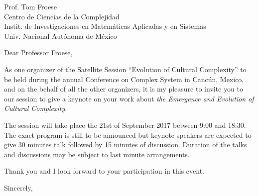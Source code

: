 \documentclass[11pt, a4paper]{letter} %
\begin{document}

\begin{letter}{
	 
	Prof.  Tom Froese\\
	Centro de Ciencias de la Complejidad\\
	Instit. de Investigaciones en Matemáticas Aplicadas y en Sistemas\\
	Univ. Nacional Autónoma de M\'exico
}


\opening{Dear Professor Froese,}




As one organizer of the Satellite Session ``Evolution of Cultural Complexity'' to be held during the annual Conference on Complex System in Cancún, Mexico, and on the behalf of all the other organizers, it is my pleasure to invite you to our session to give a keynote on your work about \emph{the Emergence and Evolution of Cultural Complexity}. 

The session will take place the 21st of September 2017 between 9:00 and 18:30. The exact program is still to be announced but keynote speakers are expected to give 30 minutes talk followed by 15 minutes of discussion.  Duration of the talks and discussions may be subject to last minute arrangements.

Thank you and I look forward to your participation in this event.


\closing{Sincerely,}


\vfill

\def\thefootnote{}
\def\footnoterule{\hrule}
\def\thefootnote{\arabic{footnote}}
%

\end{letter}
\end{document}
